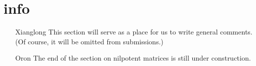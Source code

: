 \section*{info}
\begin{itemize}
	\item[Xianglong] This section will serve as a place for us to write general comments. (Of course, it will be omitted from submissions.)

    \item[Oron] The end of the section on nilpotent matrices is still under construction.
\end{itemize}
\newpage
